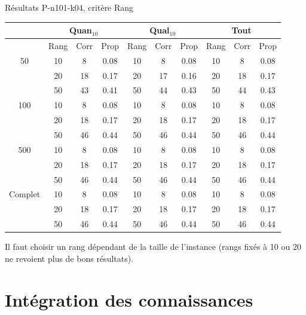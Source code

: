 \documentclass{beamer}
\begin{document}
\begin{frame}{Résultats P-n101-k04, critère Rang}
\begin{table}[H]

\begin{tabular}{|@{}c@{}|@{}c@{}|@{}c@{}|@{}c@{}||@{}c@{}|@{}c@{}|@{}c@{}||@{}c@{}|@{}c@{}|@{}c@{}|}

\hline
 & \multicolumn{3}{c|}{Quan$_{10}$} & \multicolumn{3}{c|}{Qual$_{10}$} & \multicolumn{3}{c|}{Tout} \\
 \hline
 & Rang & Corr & Prop & Rang & Corr & Prop & Rang & Corr & Prop \\
 \hline
 50 & 10  & 8 & 0.08 & 10  & 8 & 0.08 & 10  & 8 & 0.08 \\
 \cline{2-10} 
    & 20 & 18 & 0.17 & 20  & 17 & 0.16 & 20 & 18 & 0.17  \\
 \cline{2-10} 
    & 50 & 43 & 0.41 & 50 & 44 & 0.43 & 50 & 44 & 0.43  \\
  \hline
   100 & 10  & 8 & 0.08 & 10  & 8 & 0.08 & 10  & 8 & 0.08  \\
 \cline{2-10} 
    & 20 & 18 & 0.17 & 20 & 18 & 0.17 & 20 & 18 & 0.17  \\
  \cline{2-10} 
    & 50 & 46 & 0.44 & 50 & 46 & 0.44 & 50 & 46 & 0.44  \\
  \hline
   500 & 10  & 8 & 0.08 & 10  & 8 & 0.08 & 10  & 8 & 0.08  \\
 \cline{2-10} 
    & 20 & 18 & 0.17 & 20 & 18 & 0.17 & 20 & 18 & 0.17  \\
  \cline{2-10} 
    & 50 & 46 & 0.44 & 50 & 46 & 0.44 & 50 & 46 & 0.44  \\
  \hline
   Complet & 10  & 8 & 0.08 & 10  & 8 & 0.08 & 10  & 8 & 0.08  \\
 \cline{2-10} 
    & 20 & 18 & 0.17 & 20 & 18 & 0.17 & 20 & 18 & 0.17  \\
  \cline{2-10} 
    & 50 & 46 & 0.44 & 50 & 46 & 0.44 & 50 & 46 & 0.44  \\
  \hline

\end{tabular}
\end{table}
Il faut choisir un rang dépendant de la taille de l'instance (rangs fixés à 10 ou 20 ne revoient plus de bons résultats).
\end{frame}

\section{Intégration des connaissances}
\end{document}
